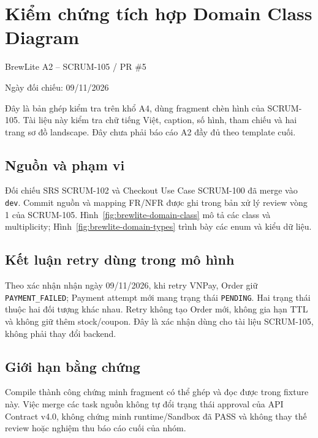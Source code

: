\documentclass[12pt,a4paper]{article}
\newcommand{\BrewLiteDiagramDir}{docs/diagrams}%
\newcommand{\BrewLiteDiagramDir}{../diagrams}%
\begin{document}
\section*{Kiểm chứng tích hợp Domain Class Diagram}
\noindent BrewLite A2 -- SCRUM-105 / PR \#5\par
\noindent Ngày đối chiếu: 09/11/2026\par

Đây là bản ghép kiểm tra trên khổ A4, dùng fragment chèn hình của SCRUM-105.
Tài liệu này kiểm tra chữ tiếng Việt, caption, số hình, tham chiếu và hai
trang sơ đồ landscape. Đây chưa phải báo cáo A2 đầy đủ theo template cuối.

\subsection*{Nguồn và phạm vi}
Đối chiếu SRS SCRUM-102 và Checkout Use Case SCRUM-100 đã merge vào
\texttt{dev}. Commit nguồn và mapping FR/NFR được ghi trong bản xử lý
review vòng 1 của SCRUM-105.
Hình~\ref{fig:brewlite-domain-class} mô tả các class và multiplicity;
Hình~\ref{fig:brewlite-domain-types} trình bày các enum và kiểu dữ liệu.

\subsection*{Kết luận retry dùng trong mô hình}
Theo xác nhận nhận ngày 09/11/2026, khi retry VNPay, Order giữ
\texttt{PAYMENT\_FAILED}; Payment attempt mới mang trạng thái
\texttt{PENDING}. Hai trạng thái thuộc hai đối tượng khác nhau.
Retry không tạo Order mới, không gia hạn TTL và không giữ thêm stock/coupon.
Đây là xác nhận dùng cho tài liệu SCRUM-105, không phải thay đổi backend.

\subsection*{Giới hạn bằng chứng}
Compile thành công chứng minh fragment có thể ghép và đọc được trong fixture
này. Việc merge các task nguồn không tự đổi trạng thái approval của API
Contract v4.0, không chứng minh runtime/Sandbox đã PASS và không thay thế
review hoặc nghiệm thu báo cáo cuối của nhóm.


\end{document}
